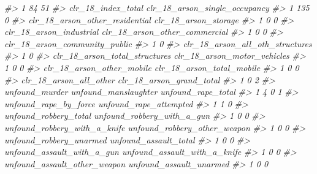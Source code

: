 \documentclass[
]{krantz}
\makeatletter
\newenvironment{Shaded}{\begin{snugshade}}{\end{snugshade}}
\newcommand{\CommentTok}[1]{\textcolor[rgb]{0.37,0.37,0.37}{\textit{#1}}}
\newenvironment{kframe}{%
\medskip{}
\setlength{\fboxsep}{.8em}
 \def\at@end@of@kframe{}%
 \ifinner\ifhmode%
  \def\at@end@of@kframe{\end{minipage}}%
  \begin{minipage}{\columnwidth}%
 \fi\fi%
 \def\FrameCommand##1{\hskip\@totalleftmargin \hskip-\fboxsep
 \colorbox{shadecolor}{##1}\hskip-\fboxsep
     \hskip-\linewidth \hskip-\@totalleftmargin \hskip\columnwidth}%
 \MakeFramed {\advance\hsize-\width
   \@totalleftmargin\z@ \linewidth\hsize
   \@setminipage}}%
 {\par\unskip\endMakeFramed%
 \at@end@of@kframe}
\renewenvironment{Shaded}{\begin{kframe}}{\end{kframe}}
\makeatother
\begin{document}
\begin{Shaded}
\begin{Highlighting}[]
\CommentTok{\#\textgreater{} 1                   84                    51}
\CommentTok{\#\textgreater{}   clr\_18\_index\_total clr\_18\_arson\_single\_occupancy}
\CommentTok{\#\textgreater{} 1                135                             0}
\CommentTok{\#\textgreater{}   clr\_18\_arson\_other\_residential clr\_18\_arson\_storage}
\CommentTok{\#\textgreater{} 1                              0                    0}
\CommentTok{\#\textgreater{}   clr\_18\_arson\_industrial clr\_18\_arson\_other\_commercial}
\CommentTok{\#\textgreater{} 1                       0                             0}
\CommentTok{\#\textgreater{}   clr\_18\_arson\_community\_public}
\CommentTok{\#\textgreater{} 1                             0}
\CommentTok{\#\textgreater{}   clr\_18\_arson\_all\_oth\_structures}
\CommentTok{\#\textgreater{} 1                               0}
\CommentTok{\#\textgreater{}   clr\_18\_arson\_total\_structures clr\_18\_arson\_motor\_vehicles}
\CommentTok{\#\textgreater{} 1                             0                           0}
\CommentTok{\#\textgreater{}   clr\_18\_arson\_other\_mobile clr\_18\_arson\_total\_mobile}
\CommentTok{\#\textgreater{} 1                         0                         0}
\CommentTok{\#\textgreater{}   clr\_18\_arson\_all\_other clr\_18\_arson\_grand\_total}
\CommentTok{\#\textgreater{} 1                      0                        2}
\CommentTok{\#\textgreater{}   unfound\_murder unfound\_manslaughter unfound\_rape\_total}
\CommentTok{\#\textgreater{} 1              4                    0                  1}
\CommentTok{\#\textgreater{}   unfound\_rape\_by\_force unfound\_rape\_attempted}
\CommentTok{\#\textgreater{} 1                     1                      0}
\CommentTok{\#\textgreater{}   unfound\_robbery\_total unfound\_robbery\_with\_a\_gun}
\CommentTok{\#\textgreater{} 1                     0                          0}
\CommentTok{\#\textgreater{}   unfound\_robbery\_with\_a\_knife unfound\_robbery\_other\_weapon}
\CommentTok{\#\textgreater{} 1                            0                            0}
\CommentTok{\#\textgreater{}   unfound\_robbery\_unarmed unfound\_assault\_total}
\CommentTok{\#\textgreater{} 1                       0                     0}
\CommentTok{\#\textgreater{}   unfound\_assault\_with\_a\_gun unfound\_assault\_with\_a\_knife}
\CommentTok{\#\textgreater{} 1                          0                            0}
\CommentTok{\#\textgreater{}   unfound\_assault\_other\_weapon unfound\_assault\_unarmed}
\CommentTok{\#\textgreater{} 1                            0                       0}

\end{Highlighting}
\end{Shaded}
\end{document}

